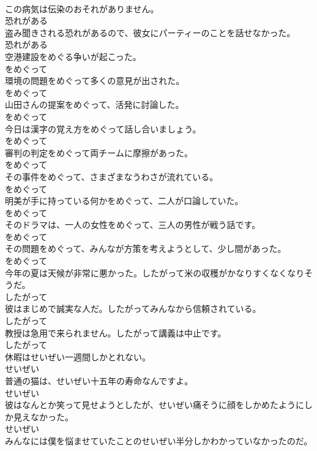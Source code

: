 \documentclass[8pt]{extreport}
\begin{document}
\begin{CJK}{UTF8}{min}
\\	この病気は伝染のおそれがありません。	
\\	恐れがある
\\	盗み聞きされる恐れがあるので、彼女にパーティーのことを話せなかった。	
\\	恐れがある
\\	空港建設をめぐる争いが起こった。	
\\	をめぐって
\\	環境の問題をめぐって多くの意見が出された。	
\\	をめぐって
\\	山田さんの提案をめぐって、活発に討論した。	
\\	をめぐって
\\	今日は漢字の覚え方をめぐって話し合いましょう。	
\\	をめぐって
\\	審判の判定をめぐって両チームに摩擦があった。	
\\	をめぐって
\\	その事件をめぐって、さまざまなうわさが流れている。	
\\	をめぐって
\\	明美が手に持っている何かをめぐって、二人が口論していた。	
\\	をめぐって
\\	そのドラマは、一人の女性をめぐって、三人の男性が戦う話です。	
\\	をめぐって
\\	その問題をめぐって、みんなが方策を考えようとして、少し間があった。	
\\	をめぐって
\\	今年の夏は天候が非常に悪かった。したがって米の収穫がかなりすくなくなりそうだ。	
\\	したがって
\\	彼はまじめで誠実な人だ。したがってみんなから信頼されている。	
\\	したがって
\\	教授は急用で来られません。したがって講義は中止です。	
\\	したがって
\\	休暇はせいぜい一週間しかとれない。	
\\	せいぜい
\\	普通の猫は、せいぜい十五年の寿命なんですよ。	
\\	せいぜい
\\	彼はなんとか笑って見せようとしたが、せいぜい痛そうに顔をしかめたようにしか見えなかった。	
\\	せいぜい
\\	みんなには僕を悩ませていたことのせいぜい半分しかわかっていなかったのだ。	

\end{CJK}
\end{document}
